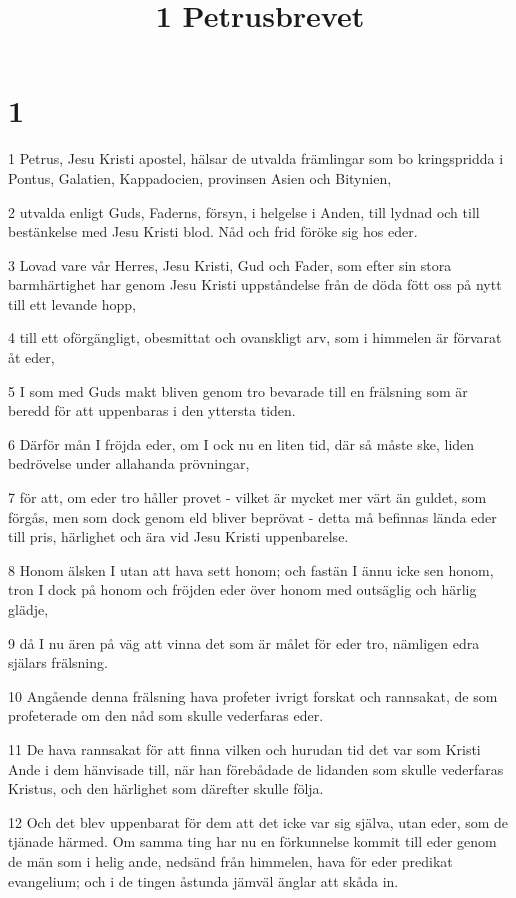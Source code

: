 

\title{1 Petrusbrevet}


\chapter{1}

\par 1 Petrus, Jesu Kristi apostel, hälsar de utvalda främlingar som bo kringspridda i Pontus, Galatien, Kappadocien, provinsen Asien och Bitynien,
\par 2 utvalda enligt Guds, Faderns, försyn, i helgelse i Anden, till lydnad och till bestänkelse med Jesu Kristi blod. Nåd och frid föröke sig hos eder.
\par 3 Lovad vare vår Herres, Jesu Kristi, Gud och Fader, som efter sin stora barmhärtighet har genom Jesu Kristi uppståndelse från de döda fött oss på nytt till ett levande hopp,
\par 4 till ett oförgängligt, obesmittat och ovanskligt arv, som i himmelen är förvarat åt eder,
\par 5 I som med Guds makt bliven genom tro bevarade till en frälsning som är beredd för att uppenbaras i den yttersta tiden.
\par 6 Därför mån I fröjda eder, om I ock nu en liten tid, där så måste ske, liden bedrövelse under allahanda prövningar,
\par 7 för att, om eder tro håller provet - vilket är mycket mer värt än guldet, som förgås, men som dock genom eld bliver beprövat - detta må befinnas lända eder till pris, härlighet och ära vid Jesu Kristi uppenbarelse.
\par 8 Honom älsken I utan att hava sett honom; och fastän I ännu icke sen honom, tron I dock på honom och fröjden eder över honom med outsäglig och härlig glädje,
\par 9 då I nu ären på väg att vinna det som är målet för eder tro, nämligen edra själars frälsning.
\par 10 Angående denna frälsning hava profeter ivrigt forskat och rannsakat, de som profeterade om den nåd som skulle vederfaras eder.
\par 11 De hava rannsakat för att finna vilken och hurudan tid det var som Kristi Ande i dem hänvisade till, när han förebådade de lidanden som skulle vederfaras Kristus, och den härlighet som därefter skulle följa.
\par 12 Och det blev uppenbarat för dem att det icke var sig själva, utan eder, som de tjänade härmed. Om samma ting har nu en förkunnelse kommit till eder genom de män som i helig ande, nedsänd från himmelen, hava för eder predikat evangelium; och i de tingen åstunda jämväl änglar att skåda in.
